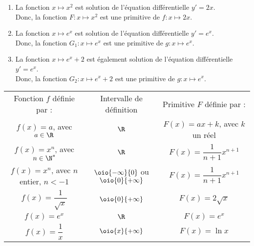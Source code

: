 \documentclass[a4paper,11pt,cours]{nsi} %
\begin{document}
\begin{exemple}[s]
    \begin{enumerate}[label=\textbullet]
        \item La fonction $x\mapsto x^2$ est solution de l'équation différentielle $y'=2x$.\\
        Donc, la fonction $F : x\mapsto x^2$ est une primitive de $f : x\mapsto 2x$.
        \item La fonction $x\mapsto e^x$ est solution de l'équation différentielle $y'=e^x$.\\
        Donc, la fonction $G_1 : x\mapsto e^x$ est une primitive de $g : x\mapsto e^x$.
        \item La fonction $x\mapsto e^x+2$ est également solution de l'équation différentielle $y'=e^x$.\\
        Donc, la fonction $G_2 : x\mapsto e^x+2$ est une primitive de $g : x\mapsto e^x$.
    \end{enumerate}
\end{exemple}

\newpage

\begin{propriete}
    \renewcommand{\arraystretch}{2}
    \tabstyle[UGLiRed]
	\begin{tabular}{|c|c|c|}
		\hline
		\ccell Fonction $f$ définie par : & \ccell Intervalle de définition & \ccell Primitive $F$ définie par :\\
        $f(x)=a$, avec $a\in \R$ & $\R$ & $F(x)=ax+k$, avec $k$ un réel \\
		\hline
		$f(x)=x^n$, avec $n\in \N^*$ & $\R$ & $F(x)=\dfrac{1}{n+1}x^{n+1}$ \\
		\hline
        $f(x)=x^n$, avec $n$ entier, $n<-1$ & $\oio{-\infty}{0}$ ou $\oio{0}{+\infty}$ & $F(x)=\dfrac{1}{n+1}x^{n+1}$ \\
        \hline
        $f(x)=\dfrac{1}{\sqrt{x}}$ & $\oio{0}{+\infty}$ & $F(x)=2\sqrt{x}$ \\
        \hline
        $f(x)=e^x$ & $\R$ & $F(x)=e^x$ \\
        \hline
        $f(x)=\dfrac{1}{x}$ & $\oio{x}{+\infty}$ & $F(x)=\ln x$ \\
		\hline
	\end{tabular}
    
\end{propriete}
\end{document}
